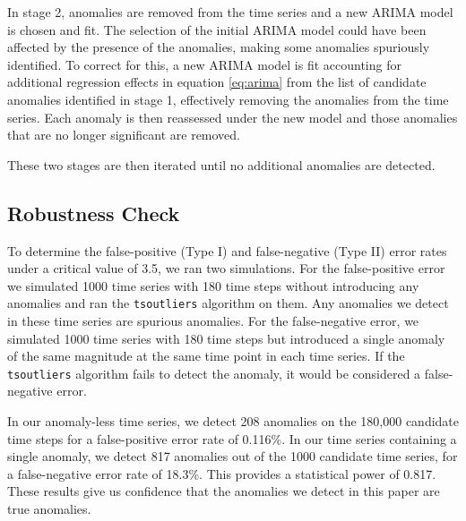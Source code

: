 \documentclass[12pt]{article}
\begin{document}
In stage 2, anomalies are removed from the time series and a new ARIMA
model is chosen and fit. The selection of the initial ARIMA model could
have been affected by the presence of the anomalies, making some
anomalies spuriously identified. To correct for this, a new ARIMA model
is fit accounting for additional regression effects in equation
\ref{eq:arima} from the list of candidate anomalies identified in stage
1, effectively removing the anomalies from the time series. Each anomaly
is then reassessed under the new model and those anomalies that are no
longer significant are removed.

These two stages are then iterated until no additional anomalies are
detected.

\hypertarget{robustness-check}{%
\subsection{Robustness Check}\label{robustness-check}}

To determine the false-positive (Type I) and false-negative (Type II)
error rates under a critical value of 3.5, we ran two simulations. For
the false-positive error we simulated 1000 time series with 180 time
steps without introducing any anomalies and ran the \texttt{tsoutliers}
algorithm on them. Any anomalies we detect in these time series are
spurious anomalies. For the false-negative error, we simulated 1000 time
series with 180 time steps but introduced a single anomaly of the same
magnitude at the same time point in each time series. If the
\texttt{tsoutliers} algorithm fails to detect the anomaly, it would be
considered a false-negative error.

In our anomaly-less time series, we detect 208 anomalies on the 180,000
candidate time steps for a false-positive error rate of 0.116\%. In our
time series containing a single anomaly, we detect 817 anomalies out of
the 1000 candidate time series, for a false-negative error rate of
18.3\%. This provides a statistical power of 0.817. These results give
us confidence that the anomalies we detect in this paper are true
anomalies.
\end{document}
